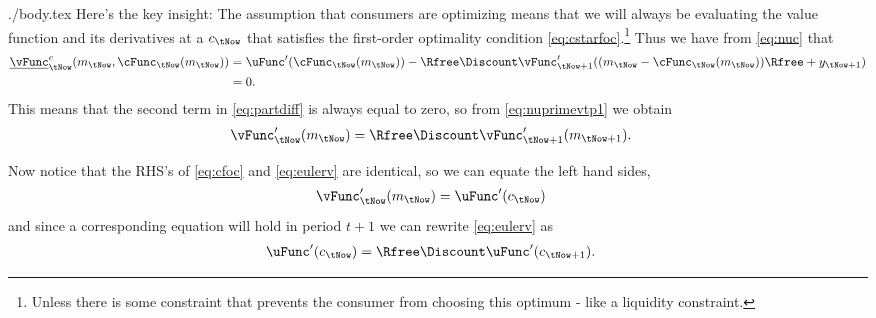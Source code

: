 \documentclass{handout}
\begin{document}
\begin{verbatimwrite}{./body.tex}
Here's the key insight:  The assumption that consumers are optimizing
means that we will always be evaluating the value function and its
derivatives at a ${c}_{\tNow}$
that satisfies the first-order optimality condition \eqref{eq:cstarfoc}.\footnote{Unless there is some constraint that prevents the consumer from choosing this optimum - like a liquidity constraint.}  Thus
we have from \eqref{eq:nuc} that 
\begin{equation}\begin{gathered}\begin{aligned}
        \underline{\vFunc}_{\tNow}^{c}({m}_{\tNow},\cFunc_{\tNow}({m}_{\tNow})) & =  \uFunc^{\prime}(\cFunc_{\tNow}({m}_{\tNow})) - \Rfree\Discount \vFunc^{\prime}_{\tNow+1}(({m}_{\tNow}-\cFunc_{\tNow}({m}_{\tNow}))\Rfree+{y}_{\tNow+1})
\\ & =  0.
\end{aligned}\end{gathered}\end{equation}
This means that the second term in \eqref{eq:partdiff}
is always equal to zero, so from \eqref{eq:nuprimevtp1} we obtain
\begin{equation}\begin{gathered}\begin{aligned}
        \vFunc^{\prime}_{\tNow}({m}_{\tNow}) & =  \Rfree \Discount \vFunc_{\tNow+1}^{\prime}({m}_{\tNow+1}). \label{eq:eulerv}
\end{aligned}\end{gathered}\end{equation}

Now notice that the RHS's of \eqref{eq:cfoc} and \eqref{eq:eulerv} are
identical, so we can equate the left hand sides,
\begin{equation}\begin{gathered}\begin{aligned}
        \vFunc_{\tNow}^{\prime}({m}_{\tNow}) & =  \uFunc^{\prime}({c}_{\tNow})
\end{aligned}\end{gathered}\end{equation}
and since a corresponding equation will hold in period $t+1$ 
we can rewrite \eqref{eq:eulerv} as 
\begin{equation}\begin{gathered}\begin{aligned}
        \uFunc^{\prime}({c}_{\tNow}) & =  \Rfree \Discount \uFunc^{\prime}({c}_{\tNow+1}).
\end{aligned}\end{gathered}\end{equation}


\end{verbatimwrite}
\end{document}
